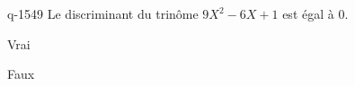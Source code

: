 \begin{truefalse}{q-1549}
Le discriminant du trinôme $9X^2-6X+1$ est égal à $0$.
\item* Vrai
\item Faux
\end{truefalse}

